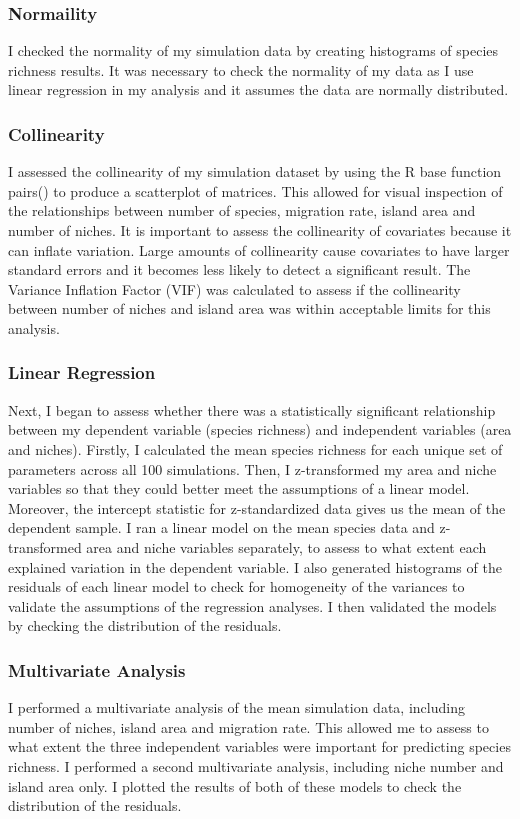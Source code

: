\documentclass{article}
\begin{document}
\subsubsection{Normaility}
I checked the normality of my simulation data by creating histograms of species richness results. It was necessary to check the normality of my data as I use linear regression in my analysis and it assumes the data are normally distributed. 

\subsubsection{Collinearity}
I assessed the collinearity of my simulation dataset by using the R base function pairs() to produce a scatterplot of matrices. This allowed for visual inspection of the relationships between number of species, migration rate, island area and number of niches. It is important to assess the collinearity of covariates because it can inflate variation. Large amounts of collinearity cause covariates to have larger standard errors and it becomes less likely to detect a significant result. The Variance Inflation Factor (VIF) was calculated to assess if the collinearity between number of niches and island area was within acceptable limits for this analysis. 

\subsubsection{Linear Regression}
Next, I began to assess whether there was a statistically significant relationship between my dependent variable (species richness) and independent variables (area and niches). Firstly, I calculated the mean species richness for each unique set of parameters across all 100 simulations. Then, I z-transformed my area and niche variables so that they could better meet the assumptions of a linear model. Moreover, the intercept statistic for z-standardized data gives us the mean of the dependent sample. I ran a linear model on the mean species data and z-transformed area and niche variables separately, to assess to what extent each explained variation in the dependent variable. I also generated histograms of the residuals of each linear model to check for homogeneity of the variances to validate the assumptions of the regression analyses. I then validated the models by checking the distribution of the residuals. 

\subsubsection{Multivariate Analysis}
I performed a multivariate analysis of the mean simulation data, including number of niches, island area and migration rate. This allowed me to assess to what extent the three independent variables were important for predicting species richness. I performed a second multivariate analysis, including niche number and island area only. I plotted the results of both of these models to check the distribution of the residuals.
\end{document}

